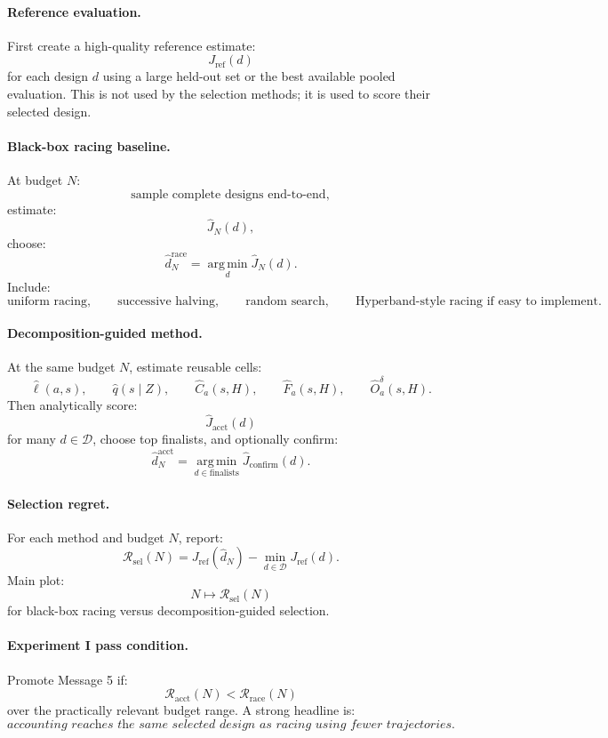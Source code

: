 \documentclass{article}
\providecommand{\argmin}{\operatorname*{arg\,min}}
\begin{document}
\paragraph{Reference evaluation.}
First create a high-quality reference estimate:
\[
    J_{\mathrm{ref}}(d)
\]
for each design \(d\) using a large held-out set or the best available pooled evaluation.
This is not used by the selection methods; it is used to score their selected design.

\paragraph{Black-box racing baseline.}
At budget \(N\):
\[
    \text{sample complete designs end-to-end},
\]
estimate:
\[
    \hat J_N(d),
\]
choose:
\[
    \hat d_N^{\mathrm{race}}
    =
    \argmin_d\hat J_N(d).
\]
Include:
\[
    \text{uniform racing},
    \qquad
    \text{successive halving},
    \qquad
    \text{random search},
    \qquad
    \text{Hyperband-style racing if easy to implement}.
\]

\paragraph{Decomposition-guided method.}
At the same budget \(N\), estimate reusable cells:
\[
    \hat \ell(a,s),
    \qquad
    \hat q(s\mid Z),
    \qquad
    \hat C_a(s,H),
    \qquad
    \hat F_a(s,H),
    \qquad
    \hat O_a^\delta(s,H).
\]
Then analytically score:
\[
    \hat J_{\mathrm{acct}}(d)
\]
for many \(d\in\mathcal D\), choose top finalists, and optionally confirm:
\[
    \hat d_N^{\mathrm{acct}}
    =
    \argmin_{d\in\mathrm{finalists}}\hat J_{\mathrm{confirm}}(d).
\]

\paragraph{Selection regret.}
For each method and budget \(N\), report:
\[
    \mathcal R_{\mathrm{sel}}(N)
    =
    J_{\mathrm{ref}}(\hat d_N)
    -
    \min_{d\in\mathcal D}J_{\mathrm{ref}}(d).
\]
Main plot:
\[
    N\mapsto \mathcal R_{\mathrm{sel}}(N)
\]
for black-box racing versus decomposition-guided selection.

\paragraph{Experiment I pass condition.}
Promote Message 5 if:
\[
    \mathcal R_{\mathrm{acct}}(N)
    <
    \mathcal R_{\mathrm{race}}(N)
\]
over the practically relevant budget range.
A strong headline is:
\[
    \textit{accounting reaches the same selected design as racing using fewer trajectories.}
\]
\end{document}
